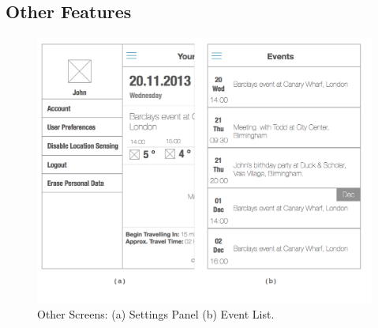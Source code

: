 \documentclass[12pt]{report}
\begin{document}
\subsection{Other Features}

\begin{figure}[htbp]
 \centering
 \includegraphics[width=130mm]{AdditionalScr.png}
   \caption[Other Screens]{Other Screens: (a) Settings Panel (b) Event List.}
 \label{fgr:AdditionalScr}
\end{figure}
\end{document}
